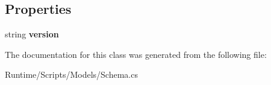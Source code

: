 \subsection*{Properties}
\begin{DoxyCompactItemize}
\item 
\mbox{\label{class_d_g_tools_1_1_database_1_1_schema_ad1484f3e002e0fa26f80e99fbbfa9396}} 
string {\bfseries version}
\end{DoxyCompactItemize}


The documentation for this class was generated from the following file\+:\begin{DoxyCompactItemize}
\item 
Runtime/\+Scripts/\+Models/Schema.\+cs\end{DoxyCompactItemize}
